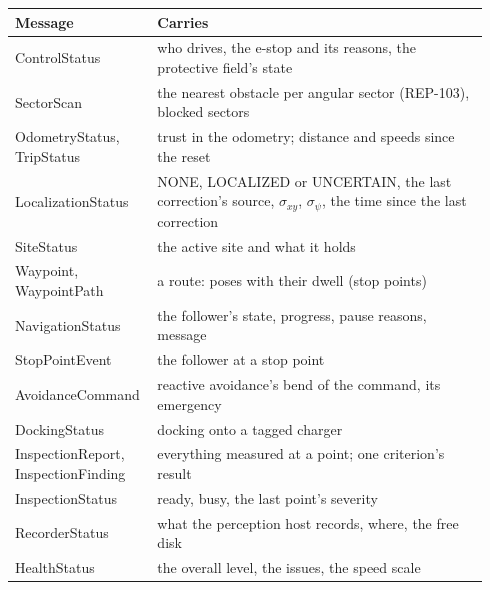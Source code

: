 \begin{center}
\begin{small}
\begin{longtable}{@{}>{\raggedright}p{0.26\linewidth}>{\raggedright\arraybackslash}p{0.68\linewidth}@{}}
  \toprule
  \textbf{Message} & \textbf{Carries} \\
  \midrule
  \endhead
  \bottomrule
  \endfoot
  ControlStatus & who drives, the e-stop and its reasons, the protective field's state \\
  SectorScan & the nearest obstacle per angular sector (REP-103), blocked sectors \\
  OdometryStatus, TripStatus & trust in the odometry; distance and speeds since the reset \\
  LocalizationStatus & NONE, LOCALIZED or UNCERTAIN, the last correction's source, $\sigma_{xy}$,
    $\sigma_\psi$, the time since the last correction \\
  SiteStatus & the active site and what it holds \\
  Waypoint, WaypointPath & a route: poses with their dwell (stop points) \\
  NavigationStatus & the follower's state, progress, pause reasons, message \\
  StopPointEvent & the follower at a stop point \\
  AvoidanceCommand & reactive avoidance's bend of the command, its emergency \\
  DockingStatus & docking onto a tagged charger \\
  InspectionReport, InspectionFinding & everything measured at a point; one criterion's result \\
  InspectionStatus & ready, busy, the last point's severity \\
  RecorderStatus & what the perception host records, where, the free disk \\
  HealthStatus & the overall level, the issues, the speed scale \\
\end{longtable}
\end{small}
\end{center}
